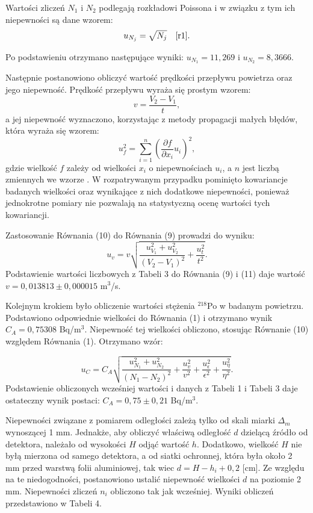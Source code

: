 \documentclass[10pt,a4paper]{article}
\begin{document}
Wartości zliczeń $N_{1}$ i $N_{2}$ podlegają rozkładowi Poissona i w związku z tym ich niepewności są dane wzorem:
\begin{equation}
u_{N_{j}}=\sqrt{N_{j}} \quad \cite{r1}.
\end{equation}

Po podstawieniu otrzymano następujące wyniki: $u_{N_{1}}=11,269$ i $u_{N_{2}}=8,3666$.

Następnie postanowiono obliczyć wartość prędkości przepływu powietrza oraz jego niepewność. Prędkość przepływu wyraża się prostym wzorem:
\begin{equation}
v=\dfrac{V_{2}-V_{1}}{t},
\end{equation}
a jej niepewność wyznaczono, korzystając z metody propagacji małych błędów, która wyraża się wzorem:
\begin{equation}
 u_{f}^2=\sum_{i=1}^n \left(\dfrac{\partial f}{\partial x_{i}}u_{i}\right)^2,
 \end{equation}
 gdzie wielkość $f$ zależy od wielkości $x_{i}$ o niepewnościach $u_{i}$, a $n$ jest liczbą zmiennych we wzorze \cite{tay2}. W rozpatrywanym przypadku pominięto kowariancje badanych wielkości oraz wynikające z nich dodatkowe niepewności, ponieważ jednokrotne pomiary nie pozwalają na statystyczną ocenę wartości tych kowariancji.
 
Zastosowanie Równania (10) do Równania (9) prowadzi do wyniku:
\begin{equation}
u_{v}=v\sqrt{\dfrac{u_{V_{1}}^2+u_{V_{2}}^2}{\left(V_{2}-V_{1}\right)^2}+\dfrac{u_{t}^2}{t^2}}.
\end{equation}
Podstawienie wartości liczbowych z Tabeli 3 do Równania (9) i (11) daje wartość $v=0,013813\pm0,000015$ m$^3$/s.

Kolejnym krokiem było obliczenie wartości stężenia $^{218}$Po w badanym powietrzu. Podstawiono odpowiednie wielkości do Równania (1) i otrzymano wynik $C_{A}=0,75308$ Bq/m$^3$. Niepewność tej wielkości obliczono, stosując Równanie (10) względem Równania (1). Otrzymano wzór:

\begin{equation}
u_{C}=C_{A}\sqrt{\dfrac{u_{N_{1}}^2+u_{N_{2}}^2}{\left(N_{1}-N_{2}\right)^2}+\dfrac{u_{v}^2}{v^2}+\dfrac{u_{\epsilon}^2}{\epsilon^2}+\dfrac{u_{\eta}^2}{\eta^2}}.
\end{equation}
Podstawienie obliczonych wcześniej wartości i danych z Tabeli 1 i Tabeli 3 daje ostateczny wynik postaci: $C_{A}=0,75\pm0,21$ Bq/m$^3$.

Niepewności związane z pomiarem odległości zależą tylko od skali miarki $\Delta_{m}$ wynoszącej 1 mm. Jednakże, aby obliczyć właściwą odległość $d$ dzielącą źródło od detektora, należało od wysokości $H$ odjąć wartość $h$. Dodatkowo, wielkość $H$ nie byłą mierzona od samego detektora, a od siatki ochronnej, która była około 2 mm przed warstwą folii aluminiowej, tak wiec $d=H-h_{i}+0,2$ [cm]. Ze względu na te niedogodności, postanowiono ustalić niepewność wielkości $d$ na poziomie 2 mm. Niepewności zliczeń $n_{i}$ obliczono tak jak wcześniej. Wyniki obliczeń przedstawiono w Tabeli 4.
\end{document}
